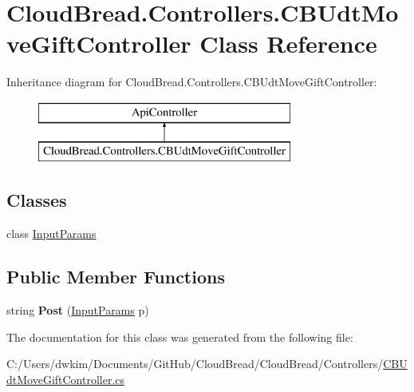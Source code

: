\hypertarget{class_cloud_bread_1_1_controllers_1_1_c_b_udt_move_gift_controller}{}\section{Cloud\+Bread.\+Controllers.\+C\+B\+Udt\+Move\+Gift\+Controller Class Reference}
\label{class_cloud_bread_1_1_controllers_1_1_c_b_udt_move_gift_controller}
Inheritance diagram for Cloud\+Bread.\+Controllers.\+C\+B\+Udt\+Move\+Gift\+Controller\+:\begin{figure}[H]
\begin{center}
\leavevmode
\includegraphics[height=2.000000cm]{class_cloud_bread_1_1_controllers_1_1_c_b_udt_move_gift_controller}
\end{center}
\end{figure}
\subsection*{Classes}
\begin{DoxyCompactItemize}
\item 
class \hyperlink{class_cloud_bread_1_1_controllers_1_1_c_b_udt_move_gift_controller_1_1_input_params}{Input\+Params}
\end{DoxyCompactItemize}
\subsection*{Public Member Functions}
\begin{DoxyCompactItemize}
\item 
string {\bfseries Post} (\hyperlink{class_cloud_bread_1_1_controllers_1_1_c_b_udt_move_gift_controller_1_1_input_params}{Input\+Params} p)\hypertarget{class_cloud_bread_1_1_controllers_1_1_c_b_udt_move_gift_controller_aad6fd43621468113744b17a91072aa13}{}\label{class_cloud_bread_1_1_controllers_1_1_c_b_udt_move_gift_controller_aad6fd43621468113744b17a91072aa13}

\end{DoxyCompactItemize}


The documentation for this class was generated from the following file\+:\begin{DoxyCompactItemize}
\item 
C\+:/\+Users/dwkim/\+Documents/\+Git\+Hub/\+Cloud\+Bread/\+Cloud\+Bread/\+Controllers/\hyperlink{_c_b_udt_move_gift_controller_8cs}{C\+B\+Udt\+Move\+Gift\+Controller.\+cs}\end{DoxyCompactItemize}
